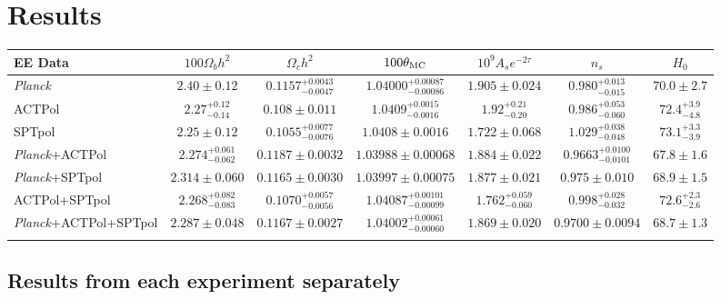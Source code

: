 \documentclass[twocolumn]{aastex63}
\newcommand{\planck}{\textsl{Planck}}
\newcommand{\Planck}{\textsl{Planck}}
\newcommand{\lcdm}{\ensuremath{\Lambda\mathrm{CDM}}}
\begin{document}
\section{Results}
\label{sec:results}

\begin{table*}
  \centering
  \caption{Posterior mean and central 68\% \lcdm\ parameter constraints from fitting to EE spectra, including in each case the $\ell<30$ \planck\ \texttt{lowE} likelihood to constrain $\tau$, with $H_0$ reported in km~s$^{-1}$~Mpc$^{-1}$}
  \begin{tabular}{lcccccc}
\hline
\hline
EE Data&$100\Omega_bh^2$&$\Omega_ch^2$&$100\theta_{\rm MC}$&$10^9A_se^{-2\tau}$&$n_s$&$H_0$\\
\hline
\planck & $2.40\pm0.12$ &  $0.1157^{+0.0043}_{-0.0047}$ & $1.04000^{+0.00087}_{-0.00086}$ & $1.905\pm0.024$ &  $0.980^{+0.013}_{-0.015}$ & $70.0\pm2.7$ \\
ACTPol & $2.27^{+0.12}_{-0.14}$ & $0.108\pm0.011$ &  $1.0409^{+0.0015}_{-0.0016}$ & $1.92^{+0.21}_{-0.20}$ & $0.986^{+0.053}_{-0.060}$ & $72.4^{+3.9}_{-4.8}$\\
SPTpol & $2.25\pm0.12$ &  $0.1055^{+0.0077}_{-0.0076}$ & $1.0408\pm0.0016$ &  $1.722\pm0.068$ &  $1.029^{+0.038}_{-0.048}$ & $73.1^{+3.3}_{-3.9}$\\
\hline
\Planck+ACTPol & $2.274^{+0.061}_{-0.062}$ & $0.1187\pm0.0032$ &  $1.03988\pm0.00068$ &  $1.884\pm0.022$ &  $0.9663^{+0.0100}_{-0.0101}$ & $67.8\pm1.6$ \\
\Planck+SPTpol & $2.314\pm0.060$ &  $0.1165\pm0.0030$ &  $1.03997\pm0.00075$ &  $1.877\pm0.021$ &  $0.975\pm0.010$ &  $68.9\pm1.5$ \\
ACTPol+SPTpol & $2.268^{+0.082}_{-0.083}$ & $0.1070^{+0.0057}_{-0.0056}$ & $1.04087^{+0.00101}_{-0.00099}$ & $1.762^{+0.059}_{-0.060}$ & $0.998^{+0.028}_{-0.032}$ & $72.6^{+2.3}_{-2.6}$\\
\hline
\Planck+ACTPol+SPTpol & $2.287\pm0.048$ &  $0.1167\pm0.0027$ &  $1.04002^{+0.00061}_{-0.00060}$ & $1.869\pm0.020$ &  $0.9700\pm0.0094$ &  $68.7\pm1.3$ \\
\hline
\label{table:results}
\end{tabular}
\end{table*}

\subsection{Results from each experiment separately}
\label{sec:resultsseparate}
\end{document}
